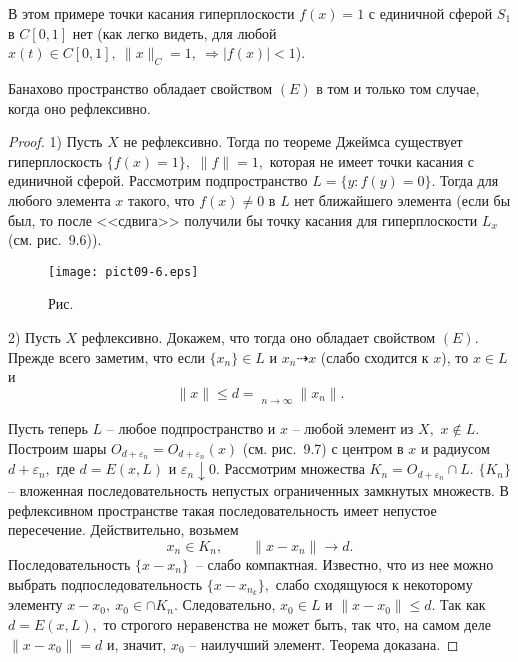 {\begin{Example}
 \noindent В этом примере точки касания гиперплоскости $f(x)=1$ с единичной сферой
 $S_1$ в $C[0,1]$ нет (как легко видеть, для любой $x(t)\in C[0,1],~ \|x\|_C=1,~
 \Longrightarrow |f(x)|<1$).
 \end{Example}

 \begin{teo} %
 Банахово пространство обладает свойством $(E)$
 в том и только том случае, когда оно рефлексивно.
 \end{teo}

 \begin{proof} %
 1) Пусть $X$ не рефлексивно. Тогда по теореме Джеймса существует
 гиперплоскость $\{ f(x)=1\},$ {$\|f\|=1,$} которая не имеет точки касания с
 единичной сферой. Рассмотрим подпространство $L=\{{y}:f(y)=0\}.$
 Тогда для любого элемента $x$ такого, что $f(x)\ne 0$ в $L$
 нет ближайшего элемента (если бы был, то после
 <<сдвига>> получили бы точку касания для гиперплоскости $L_x$ {(см. рис.~9.6)}).

 \vspace{10mm}
\begin{figure}[ht]
\begin{center}
\texttt{[image: pict09-6.eps]}
\end{center}
 \label{r9-6}

 \centerline{Рис.~\theris}
\end{figure}

 2) Пусть $X$ рефлексивно. Докажем, что тогда оно обладает свойством
 $(E).$ Прежде всего заметим, что если $\{ x_n\}\in L$ и $x_n \dashrightarrow x$
 (слабо сходится к $x$), то $x\in L$ и
 $$
 \|x\|\le d =
 \mathrel{\mathop{\underline{\lim}}\limits_{n\to \infty}} \|x_n\|.
 $$

 Пусть теперь $L$ -- любое подпространство и $x$ -- любой элемент из
 $X,$ {$x\not \in L.$} Построим шары $O_{d+\varepsilon_n}=O_{d+\varepsilon_n}(x)$ (см. рис.~9.7) с центром в $x$
 и радиусом $d+\varepsilon_n,$ где $d=E(x,L)$ и $\varepsilon_n
 \downarrow 0.$ Рассмотрим множества $K_n=O_{d+\varepsilon_n}\cap L.$
 $\{K_n\}$ -- вложенная последовательность непустых ограниченных
 замкнутых множеств.  В рефлексивном пространстве такая последовательность
 имеет непустое пересечение. Действительно, возьмем
 $$
 x_n\in K_n,\qquad \|x-x_n\| \longrightarrow d.
 $$
 Последовательность $\{x-x_n\}$~-- слабо компактная. Известно, что из нее можно
 выбрать подпоследовательность $\{x-x_{n_k}\},$
 слабо сходящуюся к некоторому элементу $x-x_0,\ x_0\in \cap K_n.$ Следовательно,
 $x_0\in L$ и $\|x-x_0\|\le
 d.$ Так как $d=E(x,L),$ то строгого неравенства не может быть, так что, на самом деле
 $\|x-x_0\|=d$ и, значит, $x_0$ -- наилучший элемент. Теорема доказана.
 \end{proof}

}
